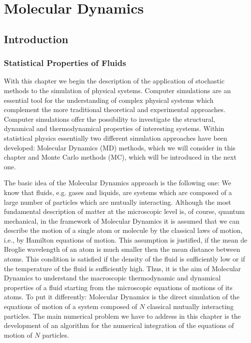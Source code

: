 \chapter{Molecular Dynamics}

\section{Introduction}
\subsection{Statistical Properties of Fluids}
With this chapter we begin the description of the application
of stochastic methods to the simulation of physical systems. Computer
simulations are an essential tool for the understanding of complex physical
systems which complement the more traditional theoretical and experimental
approaches. Computer simulations offer the possibility to investigate  the
structural, dynamical and thermodynamical properties of interesting systems. 
Within statistical physics essentially two different simulation approaches
have been developed: Molecular Dynamics (MD) methods, which we will consider
in this chapter  and Monte Carlo methods
(MC), which will be introduced in the next one.

The basic idea of the Molecular Dynamics approach is the following one: We
know that fluids, e.g. gases and liquids, are systems which are composed of a
large number of particles which are mutually interacting. 
Although the most
fundamental description of matter at the microscopic level is, of course,
quantum mechanical, in the framework of Molecular Dynamics it is assumed that
we can describe the motion of a single atom or molecule  by the classical
laws of motion, i.e., by Hamilton equations of motion. This assumption is
justified, if the mean de Broglie wavelength of an atom is much smaller
then the mean distance between atoms. This condition is satisfied if the
density of the fluid is sufficiently low  or if the temperature of the fluid
is sufficiently high. Thus, it is the aim of Molecular Dynamics to
understand the macroscopic thermodynamic and dynamical properties of a fluid
starting from the microscopic equations of motions of its atoms. To put it
differently: Molecular Dynamics is the direct simulation of the
equations of motion of a system composed of $N$ classical mutually 
interacting particles. The main numerical problem we have to address in this
chapter is the development of an algorithm for the numerical integration of
the equations of motion of $N$ particles.


